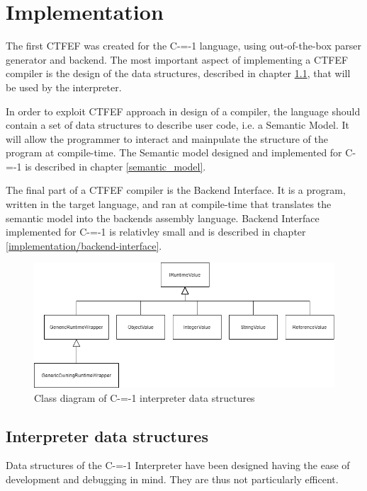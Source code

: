 \section{Implementation}
\label{implementation}

The first CTFEF was created for the C-=-1 language, using out-of-the-box parser generator and backend.
The most important aspect of implementing a CTFEF compiler is the design of the data structures, described in chapter \ref{data_structures}, that will be used by the interpreter.

In order to exploit CTFEF approach in design of a compiler, the language should contain a set of data structures to describe user code, i.e. a Semantic Model.
It will allow the programmer to interact and mainpulate the structure of the program at compile-time.
The Semantic model designed and implemented for C-=-1 is described in chapter \ref{semantic_model}.

The final part of a CTFEF compiler is the Backend Interface.
It is a program, written in the target language, and ran at compile-time that translates the semantic model into the backends assembly language.
Backend Interface implemented for C-=-1 is relativley small and is described in chapter \ref{implementation/backend-interface}.

\begin{figure}
	\includegraphics[width=16cm]{pictures/interpreter_data_structures_uml.png}
	\caption{Class diagram of C-=-1 interpreter data structures}
	\label{fig:interpreter_data_structures}
\end{figure}

\subsection{Interpreter data structures}
\label{data_structures}
Data structures of the C-=-1 Interpreter have been designed having the ease of development and debugging in mind.
They are thus not particularly efficent.

